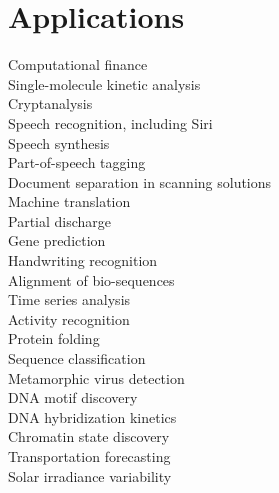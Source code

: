 \documentclass[a4paper,10pt]{article} %
\begin{document}
\section{Applications}
Computational finance\\
Single-molecule kinetic analysis\\
Cryptanalysis\\
Speech recognition, including Siri\\
Speech synthesis\\
Part-of-speech tagging\\
Document separation in scanning solutions\\
Machine translation\\
Partial discharge\\
Gene prediction\\
Handwriting recognition\\
Alignment of bio-sequences\\
Time series analysis\\
Activity recognition\\
Protein folding\\
Sequence classification\\
Metamorphic virus detection\\
DNA motif discovery\\
DNA hybridization kinetics\\
Chromatin state discovery\\
Transportation forecasting\\
Solar irradiance variability \\
\end{document}

